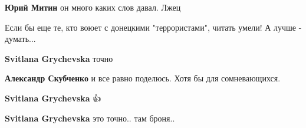 \begin{itemize}
\begin{itemize}
\textbf{Юрий Митин} он много каких слов давал. Лжец

\end{itemize}

 
Если бы еще те, кто воюет с донецкими "террористами", читать умели! А лучше - думать...

\begin{itemize}
 
\textbf{Svitlana Grychevska} точно

 
\textbf{Александр Скубченко} и все равно поделюсь. Хотя бы для сомневающихся.

 
\textbf{Svitlana Grychevska} 👍

 
\textbf{Svitlana Grychevska} это точно.. там броня..
\end{itemize}

 


\end{itemize}
